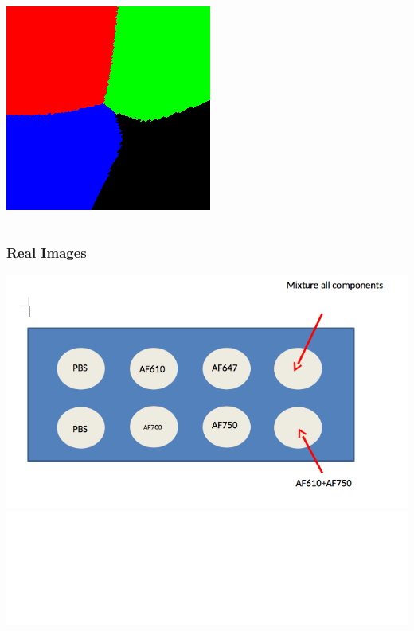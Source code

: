 \documentclass{beamer}
\begin{document}
\begin{frame}
\begin{columns}[c]
        \includegraphics[scale=0.2]{nn.png}
    \end{columns}
\end{frame}

\begin{frame}
    \frametitle{Real Images}
        \includegraphics[scale=0.2]{wells.png}
        \vspace{1mm}
        \includegraphics[scale=0.1]{wavelet_den_45.png}


\end{frame}
\end{document}
